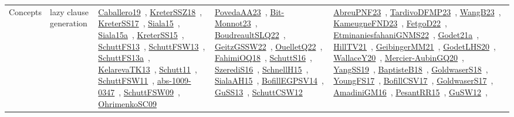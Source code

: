{\begin{longtable}{lp{3cm}>{\raggedright\arraybackslash}p{6cm}>{\raggedright\arraybackslash}p{6cm}>{\raggedright\arraybackslash}p{8cm}}
Concepts & lazy clause generation & \href{../works/Caballero19.pdf}{Caballero19}~\cite{Caballero19}, \href{../works/KreterSSZ18.pdf}{KreterSSZ18}~\cite{KreterSSZ18}, \href{../works/KreterSS17.pdf}{KreterSS17}~\cite{KreterSS17}, \href{../works/Siala15.pdf}{Siala15}~\cite{Siala15}, \href{../works/Siala15a.pdf}{Siala15a}~\cite{Siala15a}, \href{../works/KreterSS15.pdf}{KreterSS15}~\cite{KreterSS15}, \href{../works/SchuttFS13.pdf}{SchuttFS13}~\cite{SchuttFS13}, \href{../works/SchuttFSW13.pdf}{SchuttFSW13}~\cite{SchuttFSW13}, \href{../works/SchuttFS13a.pdf}{SchuttFS13a}~\cite{SchuttFS13a}, \href{../works/KelarevaTK13.pdf}{KelarevaTK13}~\cite{KelarevaTK13}, \href{../works/Schutt11.pdf}{Schutt11}~\cite{Schutt11}, \href{../works/SchuttFSW11.pdf}{SchuttFSW11}~\cite{SchuttFSW11}, \href{../works/abs-1009-0347.pdf}{abs-1009-0347}~\cite{abs-1009-0347}, \href{../works/SchuttFSW09.pdf}{SchuttFSW09}~\cite{SchuttFSW09}, \href{../works/OhrimenkoSC09.pdf}{OhrimenkoSC09}~\cite{OhrimenkoSC09} & \href{../works/PovedaAA23.pdf}{PovedaAA23}~\cite{PovedaAA23}, \href{../works/Bit-Monnot23.pdf}{Bit-Monnot23}~\cite{Bit-Monnot23}, \href{../works/BoudreaultSLQ22.pdf}{BoudreaultSLQ22}~\cite{BoudreaultSLQ22}, \href{../works/GeitzGSSW22.pdf}{GeitzGSSW22}~\cite{GeitzGSSW22}, \href{../works/OuelletQ22.pdf}{OuelletQ22}~\cite{OuelletQ22}, \href{../works/FahimiOQ18.pdf}{FahimiOQ18}~\cite{FahimiOQ18}, \href{../works/SchuttS16.pdf}{SchuttS16}~\cite{SchuttS16}, \href{../works/SzerediS16.pdf}{SzerediS16}~\cite{SzerediS16}, \href{../works/SchnellH15.pdf}{SchnellH15}~\cite{SchnellH15}, \href{../works/SialaAH15.pdf}{SialaAH15}~\cite{SialaAH15}, \href{../works/BofillEGPSV14.pdf}{BofillEGPSV14}~\cite{BofillEGPSV14}, \href{../works/GuSS13.pdf}{GuSS13}~\cite{GuSS13}, \href{../works/SchuttCSW12.pdf}{SchuttCSW12}~\cite{SchuttCSW12} & \href{../works/AbreuPNF23.pdf}{AbreuPNF23}~\cite{AbreuPNF23}, \href{../works/TardivoDFMP23.pdf}{TardivoDFMP23}~\cite{TardivoDFMP23}, \href{../works/WangB23.pdf}{WangB23}~\cite{WangB23}, \href{../works/KameugneFND23.pdf}{KameugneFND23}~\cite{KameugneFND23}, \href{../works/FetgoD22.pdf}{FetgoD22}~\cite{FetgoD22}, \href{../works/EtminaniesfahaniGNMS22.pdf}{EtminaniesfahaniGNMS22}~\cite{EtminaniesfahaniGNMS22}, \href{../works/Godet21a.pdf}{Godet21a}~\cite{Godet21a}, \href{../works/HillTV21.pdf}{HillTV21}~\cite{HillTV21}, \href{../works/GeibingerMM21.pdf}{GeibingerMM21}~\cite{GeibingerMM21}, \href{../works/GodetLHS20.pdf}{GodetLHS20}~\cite{GodetLHS20}, \href{../works/WallaceY20.pdf}{WallaceY20}~\cite{WallaceY20}, \href{../works/Mercier-AubinGQ20.pdf}{Mercier-AubinGQ20}~\cite{Mercier-AubinGQ20}, \href{../works/YangSS19.pdf}{YangSS19}~\cite{YangSS19}, \href{../works/BaptisteB18.pdf}{BaptisteB18}~\cite{BaptisteB18}, \href{../works/GoldwaserS18.pdf}{GoldwaserS18}~\cite{GoldwaserS18}, \href{../works/YoungFS17.pdf}{YoungFS17}~\cite{YoungFS17}, \href{../works/BofillCSV17.pdf}{BofillCSV17}~\cite{BofillCSV17}, \href{../works/GoldwaserS17.pdf}{GoldwaserS17}~\cite{GoldwaserS17}, \href{../works/AmadiniGM16.pdf}{AmadiniGM16}~\cite{AmadiniGM16}, \href{../works/PesantRR15.pdf}{PesantRR15}~\cite{PesantRR15}, \href{../works/GuSW12.pdf}{GuSW12}~\cite{GuSW12}, 
\end{longtable}}
